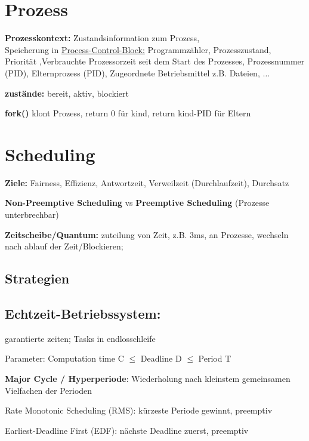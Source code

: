 \section{Prozess}
\textbf{Prozesskontext:} Zustandsinformation zum Prozess, \\
Speicherung in \underline{Process-Control-Block:} Programmzähler, Prozesszustand, Priorität ,Verbrauchte Prozessorzeit seit dem Start des Prozesses, Prozessnummer (PID), Elternprozess (PID), Zugeordnete Betriebsmittel z.B. Dateien, $\dots$

\textbf{zustände:} bereit, aktiv, blockiert 

\textbf{fork()} klont Prozess, return 0 für kind, return kind-PID für Eltern

\section{Scheduling}
\textbf{Ziele:} Fairness, Effizienz, Antwortzeit, Verweilzeit (Durchlaufzeit), Durchsatz

\textbf{Non-Preemptive Scheduling} vs \textbf{Preemptive Scheduling} (Prozesse unterbrechbar)



\textbf{Zeitscheibe/Quantum:} zuteilung von Zeit, z.B. 3ms, an Prozesse, wechseln nach ablauf der Zeit/Blockieren;


\subsection{Strategien}

\subsection{Echtzeit-Betriebssystem:} 
garantierte zeiten; Tasks in endlosschleife

Parameter: Computation time C $\leq$ Deadline D $\leq$ Period T

\textbf{ Major Cycle / Hyperperiode}: Wiederholung nach kleinstem gemeinsamen Vielfachen der Perioden

Rate Monotonic Scheduling (RMS): kürzeste Periode gewinnt, preemptiv

Earliest-Deadline First (EDF): nächste Deadline zuerst, preemptiv